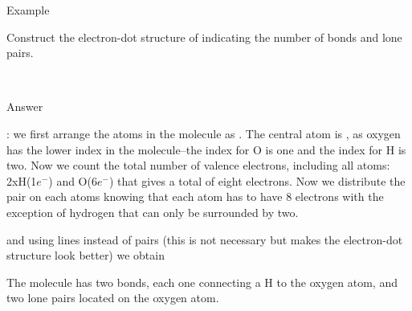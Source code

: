\documentclass[cover.tex]{subfiles}
\begin{document}
\begin{refsection}
\begin{example}{Example}
\begin{it} 
Construct the electron-dot structure of  indicating the number of bonds and lone pairs.
\end{it}\\
\Sepline
\begin{bf}Answer\end{bf}: we first arrange the atoms in the molecule as \hspace{.05in}\hspace{.05in}. The central atom is , as oxygen has the lower index in the  molecule--the index for O is one and the index for H is two. Now we count the total number of valence electrons, including all atoms: 2xH(1$e^-$) and O(6$e^-$) that gives a total of eight electrons. Now we distribute the pair on each atoms knowing that each atom has to have 8 electrons with the exception of hydrogen that can only be surrounded by two.
\begin{center}\hspace{.05in}\hspace{.05in}\hspace{.05in}\end{center} 
and using lines instead of pairs (this is not necessary but makes the electron-dot structure look better) we obtain
\begin{center}\hspace{.05in} \end{center}
The molecule has two bonds, each one connecting a H to the oxygen atom, and two lone pairs located on the oxygen atom.
\end{example}


\end{refsection}
\end{document}
